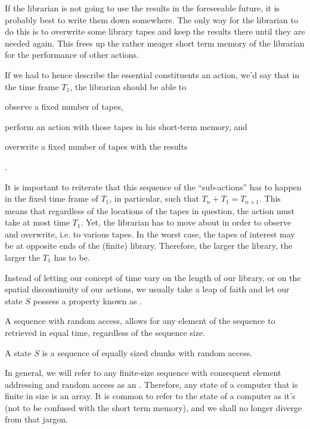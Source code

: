 If the librarian is not going to use the results in the foreseeable future, it
is probably best to write them down somewhere. The only way for the librarian
to do this is to overwrite some library tapes and keep the results there until
they are needed again. This frees up the rather meager short term memory of the
librarian for the performance of other actions.

If we had to hence describe the essential constituents an action, we'd say that
in the time frame $T_1$, the librarian should be able to
\begin{inparaenum}[(1)] \item observe a fixed number of tapes, \item perform an
action with those tapes in his short-term memory, and \item overwrite a fixed
number of tapes with the results\end{inparaenum}.

It is important to reiterate that this sequence of the ``sub-actions'' has to
happen in the fixed time frame of $T_1$, in particular, such that
$T_n+T_1=T_{n+1}$.  This means that regardless of the locations of the tapes in
question, the action must take at most time $T_1$. Yet, the librarian has to
move about in order to observe and overwrite, i.e. to  various
tapes. In the worst case, the tapes of interest may be at opposite ends of the
(finite) library.  Therefore, the larger the library, the larger the $T_1$ has
to be. 

Instead of letting our concept of time vary on the length of our library, or on
the spatial discontinuity of our actions, we usually take a leap of faith and
let our state $S$ possess a property known as .

\begin{definition}

A sequence with random access, allows for any element of the sequence to
retrieved in equal time, regardless of the sequence size.

\end{definition}

\begin{definition}

A state $S$ is a sequence of equally sized chunks with random access.

\end{definition}

In general, we will refer to any finite-size sequence with consequent element
addressing and random access as an . Therefore, any state of a
computer that is finite in size is an array. It is common to refer to the state
of a computer as it's  (not to be confused with the short term
memory), and we shall no longer diverge from that jargon.

